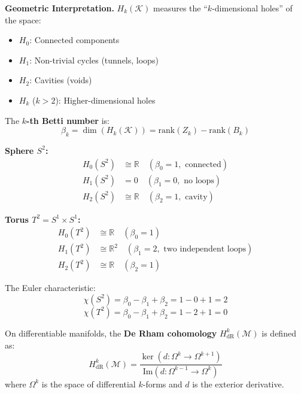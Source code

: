 \textbf{Geometric Interpretation.}\label{rem:interp_homologia} $H_k(\mathcal{K})$ measures the ``$k$-dimensional holes'' of the space:
\begin{itemize}
    \item $H_0$: Connected components
    \item $H_1$: Non-trivial cycles (tunnels, loops)
    \item $H_2$: Cavities (voids)
    \item $H_k$ ($k > 2$): Higher-dimensional holes
\end{itemize}

\begin{definition}\label{def:numeros_betti_cnn}
The \textbf{$k$-th Betti number} is:
\[\beta_k = \dim(H_k(\mathcal{K})) = \text{rank}(Z_k) - \text{rank}(B_k)\]
\end{definition}

\begin{example}\label{ex:homologia_esfera_toro}
\textbf{Sphere $S^2$:}
\begin{align}
H_0(S^2) &\cong \mathbb{R} \quad (\beta_0 = 1, \text{ connected}) \\
H_1(S^2) &= 0 \quad (\beta_1 = 0, \text{ no loops}) \\
H_2(S^2) &\cong \mathbb{R} \quad (\beta_2 = 1, \text{ cavity})
\end{align}

\textbf{Torus $T^2 = S^1 \times S^1$:}
\begin{align}
H_0(T^2) &\cong \mathbb{R} \quad (\beta_0 = 1) \\
H_1(T^2) &\cong \mathbb{R}^2 \quad (\beta_1 = 2, \text{ two independent loops}) \\
H_2(T^2) &\cong \mathbb{R} \quad (\beta_2 = 1)
\end{align}

The Euler characteristic:
\[\chi(S^2) = \beta_0 - \beta_1 + \beta_2 = 1 - 0 + 1 = 2\]
\[\chi(T^2) = \beta_0 - \beta_1 + \beta_2 = 1 - 2 + 1 = 0\]
\end{example}

\begin{definition}\label{def:cohomologia_derham}
On differentiable manifolds, the \textbf{De Rham cohomology} $H^k_{\text{dR}}(\mathcal{M})$ is defined as:
\[H^k_{\text{dR}}(\mathcal{M}) = \frac{\ker(d: \Omega^k \to \Omega^{k+1})}{\text{Im}(d: \Omega^{k-1} \to \Omega^k)}\]
where $\Omega^k$ is the space of differential $k$-forms and $d$ is the exterior derivative.
\end{definition}

